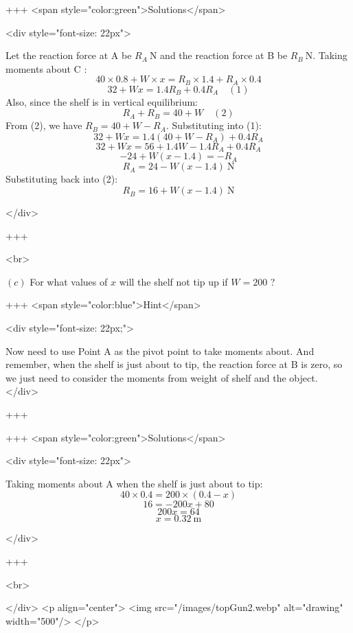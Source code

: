 +++ <span style="color:green">Solutions</span>

<div style="font-size: 22px">

Let the reaction force at A be $R_{A} \mathrm{~N}$ and the reaction force at B be $R_{B} \mathrm{~N}$.
Taking moments about C :
\[40 \times 0.8+W \times x=R_{B} \times 1.4+R_{A} \times 0.4\]
\[32+W x=1.4 R_{B}+0.4 R_{A} \quad(1)\]
Also, since the shelf is in vertical equilibrium:
\[R_{A}+R_{B}=40+W \quad(2)\]
From (2), we have $R_{B}=40+W-R_{A}$.
Substituting into (1):
\[32+W x=1.4(40+W-R_{A})+0.4 R_{A}\]
\[32+W x=56+1.4 W-1.4 R_{A}+0.4 R_{A}\]
\[-24+W(x-1.4)=-R_{A}\]
\[R_{A}=24-W(x-1.4) \mathrm{~N}\]
Substituting back into (2):
\[R_{B}=16+W(x-1.4) \mathrm{~N}\]

</div>

+++

<br>

\((c)\) For what values of $x$ will the shelf not tip up if $W=200$ ?

+++ <span style="color:blue">Hint</span>

<div style="font-size: 22px;">

Now need to use Point A as the pivot point to take moments about.
And remember, when the shelf is just about to tip, the reaction force at B is zero, so we just need to consider the moments from weight of shelf and the object.
</div>

+++

+++ <span style="color:green">Solutions</span>

<div style="font-size: 22px">

Taking moments about A when the shelf is just about to tip:
\[40 \times 0.4 = 200 \times(0.4-x)\]
\[16 = -200 x+80\]
\[200 x=64\]
\[x=0.32 \mathrm{~m}\]


</div>

+++

<br>

</div>
<p align="center">
<img src="/images/topGun2.webp" alt="drawing" width="500"/>
</p>
